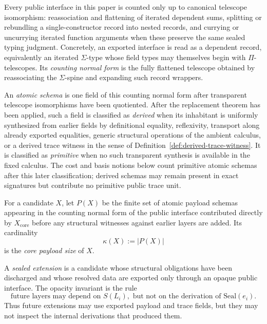 \documentclass{lmcs}
\begin{document}
\begin{defi}
Every public interface in this paper is counted only up to canonical telescope isomorphism:
reassociation and flattening of iterated dependent sums, splitting or rebundling a
single-constructor record into nested records, and currying or uncurrying iterated function
arguments when these preserve the same sealed typing judgment.  Concretely, an exported
interface is read as a dependent record, equivalently an iterated \(\Sigma\)-type whose field
types may themselves begin with \(\Pi\)-telescopes.  Its \emph{counting normal form} is the
fully flattened telescope obtained by reassociating the \(\Sigma\)-spine and expanding such
record wrappers.

An \emph{atomic schema} is one field of this counting normal form after transparent
telescope isomorphisms have been quotiented.  After the replacement theorem has been
applied, such a field is classified as \emph{derived} when its inhabitant is uniformly
synthesized from earlier fields by definitional equality, reflexivity, transport along
already exported equalities, generic structural operations of the ambient calculus, or a
derived trace witness in the sense of Definition~\ref{def:derived-trace-witness}.  It is
classified as \emph{primitive} when no such transparent synthesis is available in the fixed
calculus.  The cost and basis notions below count primitive atomic schemas after this later
classification; derived schemas may remain present in exact signatures but contribute no
primitive public trace unit.
\end{defi}

\begin{defi}
For a candidate \(X\), let \(P(X)\) be the finite set of atomic payload schemas appearing in
the counting normal form of the public interface contributed directly by
\(X_{\mathrm{core}}\) before any structural witnesses against earlier layers are added.  Its
cardinality
\[
  \kappa(X) := |P(X)|
\]
is the \emph{core payload size} of \(X\).
\end{defi}

\begin{defi}
A \emph{sealed extension} is a candidate whose structural obligations have been discharged
and whose resolved data are exported only through an opaque public interface.  The opacity
invariant is the rule
\[
  \text{future layers may depend on } S(L_i),\text{ but not on the derivation of }\mathrm{Seal}(e_i).
\]
Thus future extensions may use exported payload and trace fields, but they may not inspect
the internal derivations that produced them.
\end{defi}
\end{document}
